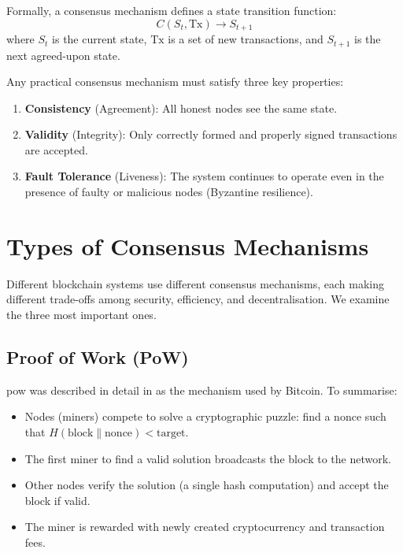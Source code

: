 Formally, a consensus mechanism defines a state transition function:
\begin{equation}
    C(S_t, \text{Tx}) \to S_{t+1}
    \label{eq:state-transition}
\end{equation}
where $S_t$ is the current state, $\text{Tx}$ is a set of new transactions, and $S_{t+1}$ is the next agreed-upon state.

Any practical consensus mechanism must satisfy three key properties:
\begin{enumerate}
    \item \textbf{Consistency} (Agreement): All honest nodes see the same state.
    \item \textbf{Validity} (Integrity): Only correctly formed and properly signed transactions are accepted.
    \item \textbf{Fault Tolerance} (Liveness): The system continues to operate even in the presence of faulty or malicious nodes (Byzantine resilience).
\end{enumerate}

\section{Types of Consensus Mechanisms}
\label{sec:consensus-types}

Different blockchain systems use different consensus mechanisms, each making different trade-offs among security, efficiency, and decentralisation. We examine the three most important ones.

\subsection{Proof of Work (PoW)}
\label{sec:pow-consensus}

\Gls{pow} was described in detail in  as the mechanism used by Bitcoin. To summarise:
\begin{itemize}
    \item Nodes (miners) compete to solve a cryptographic puzzle: find a nonce such that $H(\text{block} \| \text{nonce}) < \text{target}$.
    \item The first miner to find a valid solution broadcasts the block to the network.
    \item Other nodes verify the solution (a single hash computation) and accept the block if valid.
    \item The miner is rewarded with newly created cryptocurrency and transaction fees.
\end{itemize}

